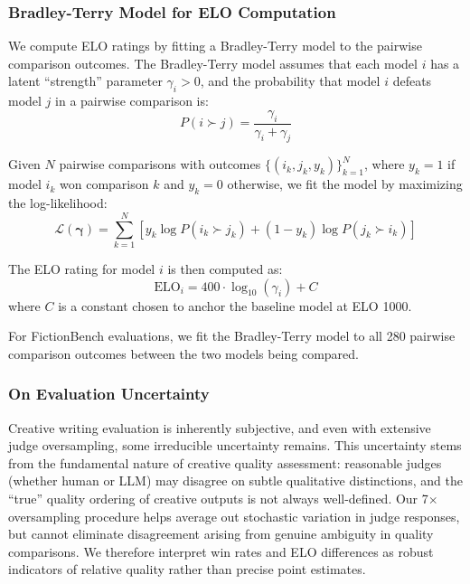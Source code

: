 \documentclass{article}
\theoremstyle{plain}
\theoremstyle{definition}
\theoremstyle{remark}
\begin{document}
\subsubsection{Bradley-Terry Model for ELO Computation}

We compute ELO ratings by fitting a Bradley-Terry model \citep{bradley1952rank} to the pairwise comparison outcomes. The Bradley-Terry model assumes that each model $i$ has a latent ``strength'' parameter $\gamma_i > 0$, and the probability that model $i$ defeats model $j$ in a pairwise comparison is:
\begin{equation}
    P(i \succ j) = \frac{\gamma_i}{\gamma_i + \gamma_j}
\end{equation}

Given $N$ pairwise comparisons with outcomes $\{(i_k, j_k, y_k)\}_{k=1}^{N}$, where $y_k = 1$ if model $i_k$ won comparison $k$ and $y_k = 0$ otherwise, we fit the model by maximizing the log-likelihood:
\begin{equation}
    \mathcal{L}(\boldsymbol{\gamma}) = \sum_{k=1}^{N} \left[ y_k \log P(i_k \succ j_k) + (1 - y_k) \log P(j_k \succ i_k) \right]
\end{equation}

The ELO rating for model $i$ is then computed as:
\begin{equation}
    \text{ELO}_i = 400 \cdot \log_{10}(\gamma_i) + C
\end{equation}
where $C$ is a constant chosen to anchor the baseline model at ELO 1000.

For FictionBench evaluations, we fit the Bradley-Terry model to all 280 pairwise comparison outcomes between the two models being compared.

\subsubsection{On Evaluation Uncertainty}

Creative writing evaluation is inherently subjective, and even with extensive judge oversampling, some irreducible uncertainty remains. This uncertainty stems from the fundamental nature of creative quality assessment: reasonable judges (whether human or LLM) may disagree on subtle qualitative distinctions, and the ``true'' quality ordering of creative outputs is not always well-defined. Our 7$\times$ oversampling procedure helps average out stochastic variation in judge responses, but cannot eliminate disagreement arising from genuine ambiguity in quality comparisons. We therefore interpret win rates and ELO differences as robust indicators of relative quality rather than precise point estimates.
\end{document}
